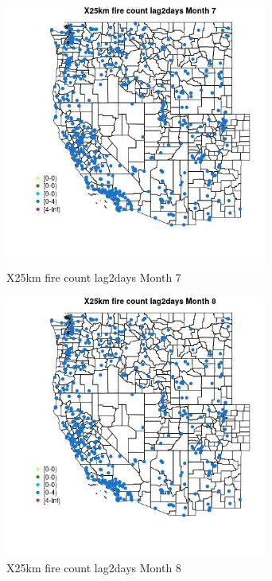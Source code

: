 \begin{figure} 
\centering  
\includegraphics[width=0.77\textwidth]{Code_Outputs/Report_ML_input_PM25_Step4_part_e_de_duplicated_aves_compiled_2019-05-14wNAs_MapObsMo7X25km_fire_count_lag2days.jpg} 
\caption{\label{fig:Report_ML_input_PM25_Step4_part_e_de_duplicated_aves_compiled_2019-05-14wNAsMapObsMo7X25km_fire_count_lag2days}X25km fire count lag2days Month 7} 
\end{figure} 
 

\begin{figure} 
\centering  
\includegraphics[width=0.77\textwidth]{Code_Outputs/Report_ML_input_PM25_Step4_part_e_de_duplicated_aves_compiled_2019-05-14wNAs_MapObsMo8X25km_fire_count_lag2days.jpg} 
\caption{\label{fig:Report_ML_input_PM25_Step4_part_e_de_duplicated_aves_compiled_2019-05-14wNAsMapObsMo8X25km_fire_count_lag2days}X25km fire count lag2days Month 8} 
\end{figure} 
 

